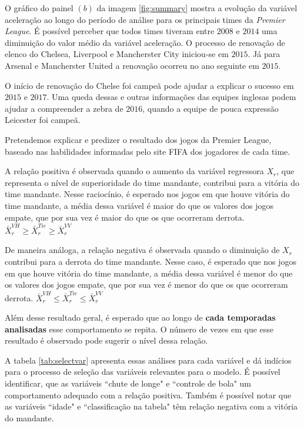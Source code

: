 \documentclass[review]{elsarticle}
\begin{document}
O gráfico do painel $(b)$ da imagem \ref{fig:summary} mostra a evolução da variável aceleração ao longo do período de análise para os principais times da \textit{Premier League}. É possível perceber que todos times tiveram entre $2008$ e $2014$ uma diminuição do valor médio da variável aceleração. O processo de renovação de elenco do Chelsea, Liverpool e Mancherster City iniciou-se em $2015$. Já para Arsenal e Mancherster United a renovação ocorreu no ano seguinte em $2015$.

O início de renovação do Chelse foi campeã pode ajudar a explicar o sucesso em $2015$ e $2017$. Uma queda dessas e outras informações das equipes inglesas podem ajudar a compreender a zebra de $2016$, quando a equipe de pouca expressão Leicester foi campeã. 

Pretendemos explicar e predizer o resultado dos jogos da Premier League, baseado nas habilidades informadas pelo site FIFA dos jogadores de cada time.


A relação positiva é observada quando o aumento da  variável regressora $X_r$, que representa o nível de superioridade do time mandante, contribui para a vitória do time mandante. Nesse raciocínio, é esperado nos jogos em que houve vitória do time mandante, a média dessa variável é maior do que os valores dos jogos empate, que por sua vez é maior do que os que ocorreram derrota. $\bar{X}_r^{VH}\geq \bar{X}_r^{Tie} \geq \bar{X}_r^{VV}$

 De maneira análoga, a relação negativa é observada quando o diminuição de $X_r$ contribui para a derrota do time mandante. Nesse caso, é esperado que nos jogos em que houve vitória do time mandante, a média dessa variável é menor do que os valores dos jogos empate, que por sua vez é menor do que os que ocorreram derrota. $\bar{X}_r^{VH} \leq \bar{X}_r^{Tie} \leq \bar{X}_r^{VV}$

Além desse resultado geral, é esperado que ao longo de \textbf{cada temporadas analisadas} esse comportamento se repita. O número de vezes em que esse resultado é observado pode sugerir o nível dessa relação.


A tabela \ref{tab:selectvar} apresenta essas análises para cada variável e dá indícios para o processo de seleção das variáveis relevantes para o modelo. É possível identificar, que as variáveis ``chute de longe" e ``controle de bola" um comportamento adequado com a relação positiva. Também é possível notar que as variáveis ``idade" e ``classificação na tabela" têm relação negativa com a vitória do mandante.
\end{document}
